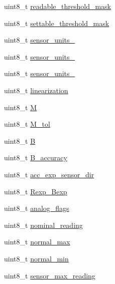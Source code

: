 \begin{DoxyCompactItemize}
\item 
uint8\-\_\-t \hyperlink{structSDR__type__01h__t_a67c459a0b04a66fdd758224883a6c3bb}{readable\-\_\-threshold\-\_\-mask}
\item 
uint8\-\_\-t \hyperlink{structSDR__type__01h__t_ac5b87fdae3ca9a1e52938e333b2a3eb7}{settable\-\_\-threshold\-\_\-mask}
\item 
uint8\-\_\-t \hyperlink{structSDR__type__01h__t_aaa5e47cc4a153c6f465aaf76c7769fcc}{sensor\-\_\-units\-\_}
\item 
uint8\-\_\-t \hyperlink{structSDR__type__01h__t_a46cc71078d51bae5045820964e1602c7}{sensor\-\_\-units\-\_}
\item 
uint8\-\_\-t \hyperlink{structSDR__type__01h__t_a350acb0ba63c9e3f153b52a2e5622e00}{sensor\-\_\-units\-\_}
\item 
uint8\-\_\-t \hyperlink{structSDR__type__01h__t_af253f0bf2f69ad4c972659fbec0358b8}{linearization}
\item 
uint8\-\_\-t \hyperlink{structSDR__type__01h__t_a5ab025c3f83129647183c9bedbd30d8e}{M}
\item 
uint8\-\_\-t \hyperlink{structSDR__type__01h__t_a69488f86b3a474445d355328fa32d8cb}{M\-\_\-tol}
\item 
uint8\-\_\-t \hyperlink{structSDR__type__01h__t_a1bd9f8363a706250f692234452c52bc1}{B}
\item 
uint8\-\_\-t \hyperlink{structSDR__type__01h__t_ad22f3c1c1ab5651ab68f5d0395b1be57}{B\-\_\-accuracy}
\item 
uint8\-\_\-t \hyperlink{structSDR__type__01h__t_a985da8cf2671359f8756d44116bca12a}{acc\-\_\-exp\-\_\-sensor\-\_\-dir}
\item 
uint8\-\_\-t \hyperlink{structSDR__type__01h__t_a8ee7018957b6a80744e98316245ce87e}{Rexp\-\_\-\-Bexp}
\item 
uint8\-\_\-t \hyperlink{structSDR__type__01h__t_a1db6fd8b5cef34cc0065a9d201b2a5b8}{analog\-\_\-flags}
\item 
uint8\-\_\-t \hyperlink{structSDR__type__01h__t_a846491f54fde8cc7e04e930a2a58288e}{nominal\-\_\-reading}
\item 
uint8\-\_\-t \hyperlink{structSDR__type__01h__t_aa4f9605e52fc3ac10e3d3627b784555d}{normal\-\_\-max}
\item 
uint8\-\_\-t \hyperlink{structSDR__type__01h__t_adf40d33112c4d5c491611457badbc931}{normal\-\_\-min}
\item 
uint8\-\_\-t \hyperlink{structSDR__type__01h__t_aeb03b938aec514ab63eeb2d041a4bac9}{sensor\-\_\-max\-\_\-reading}
\item 

\end{DoxyCompactItemize}
